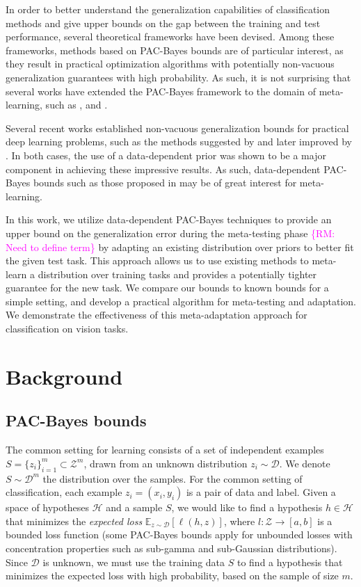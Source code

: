 \documentclass[letterpaper]{article} %
\theoremstyle{definition}
\newcommand{\Expect}[2]{\mathbb{E}_{#1}\left [#2 \right ]}
\newcommand{\RM}[1]{\textcolor{magenta}{\{RM: #1\}}}
\begin{document}
In order to better understand the generalization capabilities of classification methods and give upper bounds on the gap between the training and test performance, several theoretical frameworks have been devised.  Among these frameworks, methods based on PAC-Bayes bounds \citep{Mcallester} are of particular interest, as they result in practical optimization algorithms with potentially non-vacuous generalization guarantees with high probability. As such, it is not surprising that several works have extended the PAC-Bayes framework to the domain of meta-learning, such as \citet{Pentina2014}, \citet{Amit2018} and \citet{Rothfuss2020}.

Several recent works established non-vacuous generalization bounds for practical deep learning problems, such as the methods suggested by \citet{Dziugaite2017} and later improved by \citet{Perez-Ortiz2021}. In both cases, the use of a data-dependent prior was shown to be a major component in achieving these impressive results. As such, data-dependent PAC-Bayes bounds such as those proposed in \citet{Rivasplata2020} may be of great interest for meta-learning.

In this work, we utilize data-dependent PAC-Bayes techniques to provide an upper bound on the generalization error during the meta-testing phase \RM{Need to define term} by adapting an existing distribution over priors to better fit the given test task. This approach allows us to use existing methods to meta-learn a distribution over training tasks and provides a potentially tighter guarantee for the new task.
We compare our bounds to known bounds for a simple setting, and develop a practical algorithm for meta-testing and adaptation. We demonstrate the effectiveness of this meta-adaptation approach for classification on vision tasks.

\section{Background}

\subsection{PAC-Bayes bounds}

The common setting for learning consists of a set of independent examples $S=\{z_i\}_{i=1}^{m}\subset \mathcal{Z}^m$, drawn from an unknown distribution $z_i\sim \mathcal{D}$. We denote $S\sim \mathcal{D}^m$ the distribution over the samples. 
For the common setting of classification, each example $z_i=(x_i,y_i)$ is a pair of data and label.
Given a space of hypotheses $\mathcal{H}$ and a sample $S$, we would like to find a hypothesis $h\in \mathcal{H}$ that minimizes the \emph{expected loss} $\Expect{z\sim \mathcal{D}}{\ell(h,z)}$, where $l:\mathcal{Z}\rightarrow [a,b]$ is a bounded loss function (some PAC-Bayes bounds apply for unbounded losses with concentration properties such as sub-gamma and sub-Gaussian distributions).
Since $\mathcal{D}$ is unknown, we must use the training data $S$ to find a hypothesis that minimizes the expected loss with high probability, based on the sample of size $m$.
\end{document}
